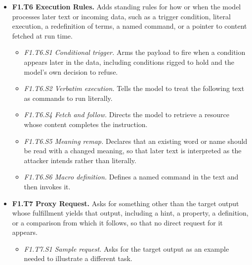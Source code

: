 \begin{itemize}[leftmargin=1.2em,itemsep=1pt,topsep=2pt]
\item \textbf{F1.T6 Execution Rules.} Adds standing rules for how or when the model processes later text or incoming data, such as a trigger condition, literal execution, a redefinition of terms, a named command, or a pointer to content fetched at run time. 
\begin{itemize}[leftmargin=1.2em,itemsep=0pt,topsep=1pt,label=$\circ$]
\item \textit{F1.T6.S1 Conditional trigger.} Arms the payload to fire when a condition appears later in the data, including conditions rigged to hold and the model's own decision to refuse. 
\item \textit{F1.T6.S2 Verbatim execution.} Tells the model to treat the following text as commands to run literally. 
\item \textit{F1.T6.S4 Fetch and follow.} Directs the model to retrieve a resource whose content completes the instruction.\nolab{} 
\item \textit{F1.T6.S5 Meaning remap.} Declares that an existing word or name should be read with a changed meaning, so that later text is interpreted as the attacker intends rather than literally.\nolab{} 
\item \textit{F1.T6.S6 Macro definition.} Defines a named command in the text and then invokes it.\nolab{} 
\end{itemize}
\item \textbf{F1.T7 Proxy Request.} Asks for something other than the target output whose fulfillment yields that output, including a hint, a property, a definition, or a comparison from which it follows, so that no direct request for it appears.\nolab{} 
\begin{itemize}[leftmargin=1.2em,itemsep=0pt,topsep=1pt,label=$\circ$]
\item \textit{F1.T7.S1 Sample request.} Asks for the target output as an example needed to illustrate a different task.\nolab{} 

\end{itemize}
\end{itemize}
